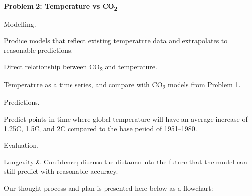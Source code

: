 \documentclass{mcmthesis}
\begin{document}
    \noindent\textbf{Problem 2: Temperature vs CO\textsubscript{2}}

    \begin{adjustwidth}{1cm}{}

        \noindent Modelling.

        \vspace{-6pt}
        \noindent Prodice models that reflect existing temperature data and extrapolates to reasonable predictions.

        \begin{adjustwidth}{1cm}{}
            \noindent Direct relationship between CO\textsubscript{2} and temperature.

            \noindent Temperature as a time series, and compare with CO\textsubscript{2} models from Problem 1.
        \end{adjustwidth}

        \noindent Predictions.

        \vspace{-6pt}
        \noindent Predict points in time where global temperature will have an average increase of 1.25\textdegree C, 1.5\textdegree C, and 2\textdegree C compared to the base period of 1951--1980.

        \noindent Evaluation.

        \vspace{-6pt}
        \noindent Longevity \& Confidence; discuss the distance into the future that the model can still predict with reasonable accuracy.


    \end{adjustwidth}

    \bigskip

    \noindent Our thought process and plan is presented here below as a flowchart:
    \begin{center}
    \end{center}
\end{document}
